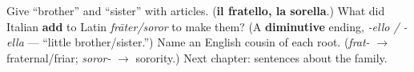 \begin{tcolorbox}[breakable,colback=teal!4,colframe=teal!35!black,title={Before you move on}]
Give \textquotedblleft{}brother\textquotedblright{} and \textquotedblleft{}sister\textquotedblright{} with articles. (\textbf{il fratello, la sorella}.) What did Italian \textbf{add} to Latin \emph{frāter/soror} to make them? (A \textbf{diminutive} ending, \emph{-ello / -ella} — \textquotedblleft{}little brother/sister.\textquotedblright{}) Name an English cousin of each root. (\emph{frat-} $\to$ fraternal/friar; \emph{soror-} $\to$ sorority.) Next chapter: sentences about the family.
\end{tcolorbox}
